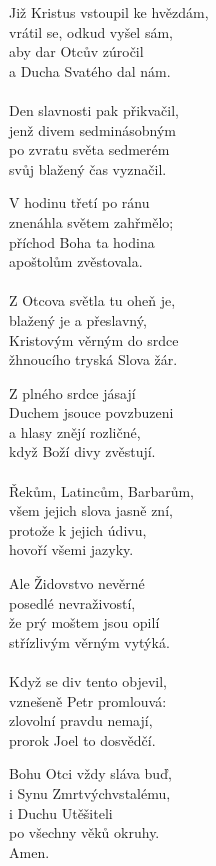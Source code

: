 \begin{translatioMulticol}{5}
Již Kristus vstoupil ke hvězdám,\\
vrátil se, odkud vyšel sám,\\
aby dar Otcův zúročil\\
a Ducha Svatého dal nám.\\
\\
Den slavnosti pak přikvačil,\\
jenž divem sedminásobným\\
po zvratu světa sedmerém\\
svůj blažený čas vyznačil.\columnbreak

V hodinu třetí po ránu\\
znenáhla světem zahřmělo;\\
příchod Boha ta hodina\\
apoštolům zvěstovala.\\
\\
Z Otcova světla tu oheň je,\\
blažený je a přeslavný,\\
Kristovým věrným do srdce\\
žhnoucího tryská Slova žár.\columnbreak

Z plného srdce jásají\\
Duchem jsouce povzbuzeni\\
a hlasy znějí rozličné,\\
když Boží divy zvěstují.\\
\\
Řekům, Latincům, Barbarům,\\
všem jejich slova jasně zní,\\
protože k jejich údivu,\\
hovoří všemi jazyky.\columnbreak

Ale Židovstvo nevěrné\\
posedlé nevraživostí,\\
že prý moštem jsou opilí\\
střízlivým věrným vytýká.\\
\\
Když se div tento objevil,\\
vznešeně Petr promlouvá:\\
zlovolní pravdu nemají,\\
prorok Joel to dosvědčí.\columnbreak

Bohu Otci vždy sláva buď,\\
i Synu Zmrtvýchvstalému,\\
i Duchu Utěšiteli\\
po všechny věků okruhy.\\
Amen.
\end{translatioMulticol}
